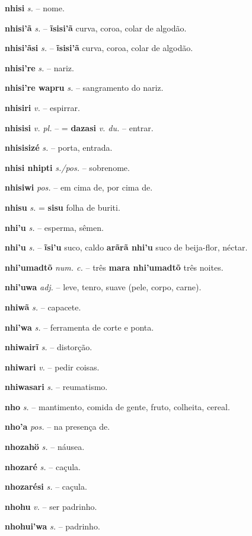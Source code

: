 \textbf{nhisi} \textit{s.} -- nome.

\textbf{nhisi'ã} \textit{s.} -- \textbf{ĩsisi'ã} curva, coroa, colar de algodão.

\textbf{nhisi'ãsi} \textit{s.} -- \textbf{ĩsisi'ã} curva, coroa, colar de algodão.

\textbf{nhisi're} \textit{s.} -- nariz.

\textbf{nhisi're wapru} \textit{s.} -- sangramento do nariz.

\textbf{nhisiri} \textit{v.} -- espirrar.

\textbf{nhisisi} \textit{v. pl.} -- = \textbf{dazasi} \textit{v. du.} -- entrar.

\textbf{nhisisizé} \textit{s.} -- porta, entrada.

\textbf{nhisi nhipti} \textit{s./pos.} -- sobrenome.

\textbf{nhisiwi} \textit{pos.} -- em cima de, por cima de.

\textbf{nhisu} \textit{s.} = \textbf{sisu} folha de buriti.

\textbf{nhi'u} \textit{s.} -- esperma, sêmen.

\textbf{nhi'u} \textit{s.} -- \textbf{ĩsi'u} suco, caldo  \textbf{arãrã nhi'u} suco de beija-flor, néctar.

\textbf{nhi'umadtõ} \textit{num. c.} -- três  \textbf{mara nhi'umadtõ} três noites.

\textbf{nhi'uwa} \textit{adj.} -- leve, tenro, suave (pele, corpo, carne).

\textbf{nhiwã} \textit{s.} -- capacete.

\textbf{nhi'wa} \textit{s.} -- ferramenta de corte e ponta.

\textbf{nhiwairĩ} \textit{s.} -- distorção.

\textbf{nhiwari} \textit{v.} -- pedir coisas.

\textbf{nhiwasari} \textit{s.} -- reumatismo.

\textbf{nho} \textit{s.} -- mantimento, comida de gente, fruto, colheita, cereal.

\textbf{nho'a} \textit{pos.} -- na presença de.

\textbf{nhozahö} \textit{s.} -- náusea.

\textbf{nhozaré} \textit{s.} -- caçula.

\textbf{nhozarési} \textit{s.} -- caçula.

\textbf{nhohu} \textit{v.} -- ser padrinho.

\textbf{nhohui'wa} \textit{s.} -- padrinho.

